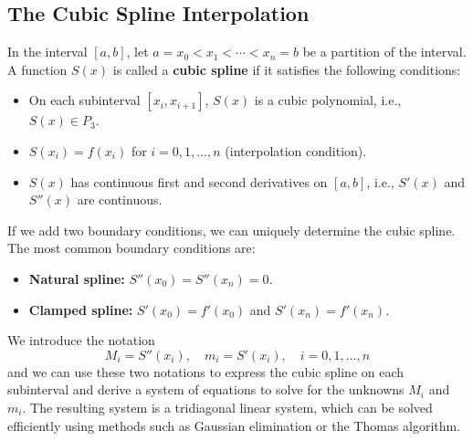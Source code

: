 \documentclass{matharticle}
\begin{document}
\subsection{The Cubic Spline Interpolation}

\begin{definition}
	In the interval $[a, b]$, let $a = x_0 < x_1 < \cdots < x_n = b$ be a partition of the interval. A function $S(x)$ is called a \textbf{cubic spline} if it satisfies the following conditions:
	\begin{itemize}
		\item On each subinterval $[x_i, x_{i+1}]$, $S(x)$ is a cubic polynomial, i.e., $S(x) \in P_3$.
		\item $S(x_i) = f(x_i)$ for $i = 0, 1, \ldots, n$ (interpolation condition).
		\item $S(x)$ has continuous first and second derivatives on $[a, b]$, i.e., $S'(x)$ and $S''(x)$ are continuous.
	\end{itemize}
	If we add two boundary conditions, we can uniquely determine the cubic spline. The most common boundary conditions are:
	\begin{itemize}
		\item \textbf{Natural spline:} $S''(x_0) = S''(x_n) = 0$.
		\item \textbf{Clamped spline:} $S'(x_0) = f'(x_0)$ and $S'(x_n) = f'(x_n)$.
	\end{itemize}
\end{definition}

We introduce the notation
\begin{equation}
	M_i = S''(x_i), \quad m_i = S'(x_i), \quad i = 0, 1, \ldots, n
\end{equation}
and we can use these two notations to express the cubic spline on each subinterval and derive a system of equations to solve for the unknowns $M_i$ and $m_i$. The resulting system is a tridiagonal linear system, which can be solved efficiently using methods such as Gaussian elimination or the Thomas algorithm.
\end{document}
